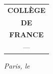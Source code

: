 \begin{tabular}{c}
\textbf{COLLÈGE}\\[.3em]
\textbf{DE}\\[.3em]
\textbf{FRANCE}\\
---
\end{tabular}
\hfill\textit{Paris, le}

